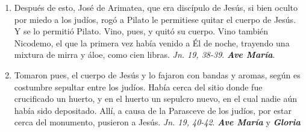 \documentclass[../../devocionario.tex]{subfiles}
\begin{document}
\begin{enumerate}
        \item Después de esto, José de Arimatea, que era discípulo de Jesús, si bien oculto por miedo a los judíos, rogó a Pilato le permitiese
            quitar el cuerpo de Jesús. Y se lo permitió Pilato. Vino, pues, y quitó su cuerpo. Vino también Nicodemo, el que la primera vez había
            venido a Él de noche, trayendo una mixtura de mirra y áloe, como cien libras.
            \emph{Jn. 19, 38-39}. \textbf{\emph{Ave María}}.            

        \item Tomaron pues, el cuerpo de Jesús y lo fajaron con bandas y aromas, según es costumbre sepultar entre los judíos. Había cerca
            del sitio donde fue crucificado un huerto, y en el huerto un sepulcro nuevo, en el cual nadie aún había sido depositado.
            Allí, a causa de la Parasceve de los judíos, por estar cerca del monumento, pusieron a Jesús. 
            \emph{Jn. 19, 40-42}. \textbf{\emph{Ave María}} y \textbf{\emph{Gloria}}

    \end{enumerate}
\end{document}
